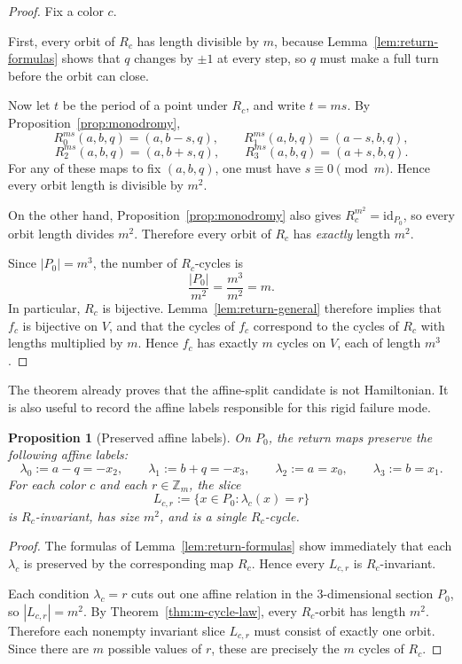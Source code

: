 \documentclass[11pt]{article}
\newtheorem{proposition}[lemma]{Proposition}
\theoremstyle{definition}
\theoremstyle{remark}
\newcommand{\Zm}{\mathbb Z_m}
\begin{document}
\begin{proof}
Fix a color $c$.

First, every orbit of $R_c$ has length divisible by $m$, because Lemma~\ref{lem:return-formulas} shows that $q$ changes by $\pm 1$ at every step, so $q$ must make a full turn before the orbit can close.

Now let $t$ be the period of a point under $R_c$, and write $t=ms$. By Proposition~\ref{prop:monodromy},
\[
R_0^{ms}(a,b,q)=(a,b-s,q),
\qquad
R_1^{ms}(a,b,q)=(a-s,b,q),
\]
\[
R_2^{ms}(a,b,q)=(a,b+s,q),
\qquad
R_3^{ms}(a,b,q)=(a+s,b,q).
\]
For any of these maps to fix $(a,b,q)$, one must have $s\equiv 0\pmod m$. Hence every orbit length is divisible by $m^2$.

On the other hand, Proposition~\ref{prop:monodromy} also gives $R_c^{m^2}=\mathrm{id}_{P_0}$, so every orbit length divides $m^2$. Therefore every orbit of $R_c$ has \emph{exactly} length $m^2$.

Since $|P_0|=m^3$, the number of $R_c$-cycles is
\[
\frac{|P_0|}{m^2}=\frac{m^3}{m^2}=m.
\]
In particular, $R_c$ is bijective. Lemma~\ref{lem:return-general} therefore implies that $f_c$ is bijective on $V$, and that the cycles of $f_c$ correspond to the cycles of $R_c$ with lengths multiplied by $m$. Hence $f_c$ has exactly $m$ cycles on $V$, each of length $m^3$.
\end{proof}

The theorem already proves that the affine-split candidate is not Hamiltonian. It is also useful to record the affine labels responsible for this rigid failure mode.

\begin{proposition}[Preserved affine labels]\label{prop:labels}
On $P_0$, the return maps preserve the following affine labels:
\[
\lambda_0:=a-q=-x_2,
\qquad
\lambda_1:=b+q=-x_3,
\qquad
\lambda_2:=a=x_0,
\qquad
\lambda_3:=b=x_1.
\]
For each color $c$ and each $r\in\Zm$, the slice
\[
L_{c,r}:=\{x\in P_0:\lambda_c(x)=r\}
\]
is $R_c$-invariant, has size $m^2$, and is a single $R_c$-cycle.
\end{proposition}

\begin{proof}
The formulas of Lemma~\ref{lem:return-formulas} show immediately that each $\lambda_c$ is preserved by the corresponding map $R_c$. Hence every $L_{c,r}$ is $R_c$-invariant.

Each condition $\lambda_c=r$ cuts out one affine relation in the $3$-dimensional section $P_0$, so $|L_{c,r}|=m^2$. By Theorem~\ref{thm:m-cycle-law}, every $R_c$-orbit has length $m^2$. Therefore each nonempty invariant slice $L_{c,r}$ must consist of exactly one orbit. Since there are $m$ possible values of $r$, these are precisely the $m$ cycles of $R_c$.
\end{proof}
\end{document}
